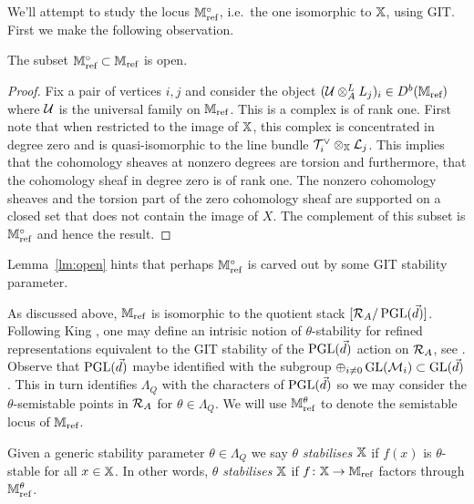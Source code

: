 \documentclass[12pt]{amsart}
\begin{document}
We'll attempt to study the locus $\mathbb{M}_{\text{ref}}^\circ$, i.e.\ the one isomorphic to $\mathbb{X}$, using GIT.
First we make the following observation.

\begin{lemma}\label{lm:open}
The subset $\mathbb{M}_{\textup{ref}}^\circ \subset \mathbb{M}_{\textup{ref}}$ is open.
\end{lemma}

\begin{proof}
Fix a pair of vertices $i,j$ and consider the object $(\mathcal{U} \otimes^L_A L_j)_i \in D^b(\mathbb{M}_\text{ref})$ where $\mathcal{U}$ is the universal family on  $\mathbb{M}_{\text{ref}}$. This is a complex is of rank one.
First note that when restricted to the image of $\mathbb{X}$, this complex is concentrated in degree zero and is quasi-isomorphic to the line bundle $\mathcal{T}_i^{\vee} \otimes_{\mathbb{X}} \mathcal{L}_j$. This implies that the cohomology sheaves at nonzero degrees are torsion and furthermore, that the cohomology sheaf in degree zero is of rank one.
The nonzero cohomology sheaves and the torsion part of the zero cohomology sheaf are supported on a closed set that does not contain the image of $X$. The complement of this subset is $\mathbb{M}_{\text{ref}}^\circ$ and hence the result.
\end{proof}

Lemma~\ref{lm:open} hints that perhaps $\mathbb{M}^\circ_{\textup{ref}}$ is carved out by some GIT stability parameter. 

As discussed above, $\mathbb{M}_{\text{ref}}$ is isomorphic to the quotient stack $[\mathcal{R}_A/ \operatorname{PGL}(\vec{d})]$.
Following King \cite{Ki}, one may define an intrisic notion of $\theta$-stability for refined representations equivalent to the GIT stability of the $\operatorname{PGL}(\vec{d})$ action on $\mathcal{R}_A$,  see \cite[Definition 3.4]{Abd}. 
Observe that $\operatorname{PGL}(\vec{d})$ maybe identified with the subgroup $\oplus_{i\neq 0} \operatorname{GL}(\mathcal{M}_i) \subset \operatorname{GL}(\vec{d})$.
This in turn identifies $\Lambda_Q$ with the characters of $\operatorname{PGL}(\vec{d})$ so we may consider the $\theta$-semistable points in $\mathcal{R}_A$ for $\theta \in \Lambda_Q$.
We will use $\mathbb{M}_{\textup{ref}}^\theta$ to denote the semistable locus of $\mathbb{M}_{\textup{ref}}$.


\begin{definition}
Given a generic stability parameter $\theta \in \Lambda_Q$ we say {\em $\theta$ stabilises $\mathbb{X}$} if $f(x)$ is $\theta$-stable for all $x \in \mathbb{X}$.
In other words, {\em $\theta$ stabilises $\mathbb{X}$} if $f \colon \mathbb{X} \rightarrow \mathbb{M}_{\textup{ref}}$ factors through $\mathbb{M}_{\textup{ref}}^\theta$.
\end{definition}
\end{document}
